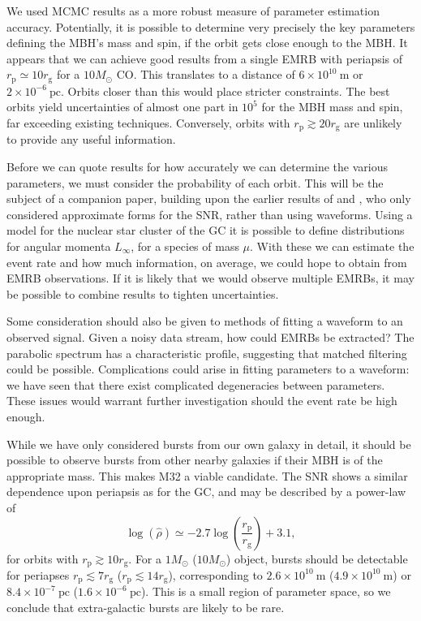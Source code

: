 \documentclass[useAMS,usedcolumn,usegraphicx,usenatbib]{mn2e}
\newcommand{\units}[1]{\ensuremath{~\mathrm{#1}}}
\newcommand{\sub}[1]{\ensuremath{_\mathrm{#1}}}
\begin{document}
We used MCMC results as a more robust measure of parameter estimation accuracy. Potentially, it is possible to determine very precisely the key parameters defining the MBH's mass and spin, if the orbit gets close enough to the MBH. It appears that we can achieve good results from a single EMRB with periapsis of $r\sub{p} \simeq 10 r\sub{g}$ for a $10 M_\odot$ CO. This translates to a distance of $6 \times 10^{10}\units{m}$ or $2 \times 10^{-6}\units{pc}$. Orbits closer than this would place stricter constraints. The best orbits yield uncertainties of almost one part in $10^5$ for the MBH mass and spin, far exceeding existing techniques. Conversely, orbits with $r\sub{p} \gtrsim 20 r\sub{g}$ are unlikely to provide any useful information.

Before we can quote results for how accurately we can determine the various parameters, we must consider the probability of each orbit. This will be the subject of a companion paper, building upon the earlier results of \citet{Rubbo2006} and \citet{Hopman2007}, who only considered approximate forms for the SNR, rather than using waveforms. Using a model for the nuclear star cluster of the GC it is possible to define distributions for angular momenta $L_\infty$, for a species of mass $\mu$. With these we can estimate the event rate and how much information, on average, we could hope to obtain from EMRB observations. If it is likely that we would observe multiple EMRBs, it may be possible to combine results to tighten uncertainties.

Some consideration should also be given to methods of fitting a waveform to an observed signal. Given a noisy data stream, how could EMRBs be extracted? The parabolic spectrum has a characteristic profile, suggesting that matched filtering could be possible. Complications could arise in fitting parameters to a waveform: we have seen that there exist complicated degeneracies between parameters. These issues would warrant further investigation should the event rate be high enough.

While we have only considered bursts from our own galaxy in detail, it should be possible to observe bursts from other nearby galaxies if their MBH is of the appropriate mass. This makes M32 a viable candidate. The SNR shows a similar dependence upon periapsis as for the GC, and may be described by a power-law of
\begin{equation}
\log\left(\hat{\rho}\right) \simeq -2.7\log\left(\frac{r\sub{p}}{r\sub{g}}\right) + 3.1,
\end{equation}
for orbits with $r\sub{p} \gtrsim 10 r\sub{g}$. For a $1 M_\odot$ ($10 M_\odot$) object, bursts should be detectable for periapses $r\sub{p} \lesssim 7 r\sub{g}$ ($r\sub{p} \lesssim 14 r\sub{g}$), corresponding to $2.6 \times 10^{10}\units{m}$ ($4.9 \times 10^{10}\units{m}$) or $8.4 \times 10^{-7}\units{pc}$ ($1.6 \times 10^{-6}\units{pc}$). This is a small region of parameter space, so we conclude that extra-galactic bursts are likely to be rare.
\end{document}

